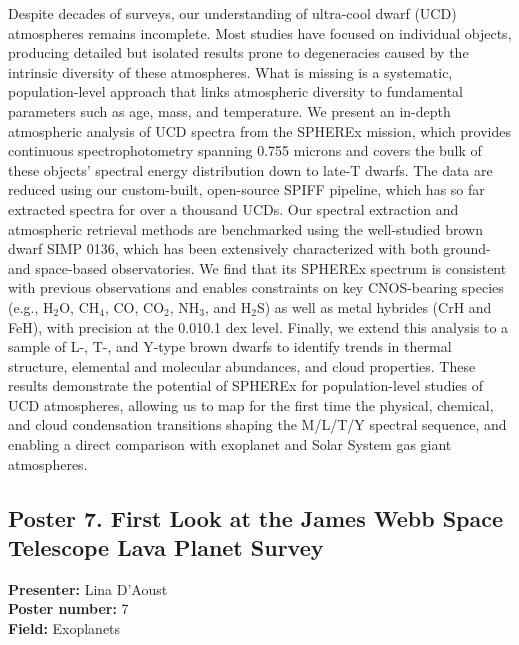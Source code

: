 Despite decades of surveys, our understanding of ultra-cool dwarf (UCD) atmospheres remains incomplete. Most studies have focused on individual objects, producing detailed but isolated results prone to degeneracies caused by the intrinsic diversity of these atmospheres. What is missing is a systematic, population-level approach that links atmospheric diversity to fundamental parameters such as age, mass, and temperature. We present an in-depth atmospheric analysis of UCD spectra from the SPHEREx mission, which provides continuous spectrophotometry spanning 0.755 microns and covers the bulk of these objects' spectral energy distribution down to late-T dwarfs. The data are reduced using our custom-built, open-source SPIFF pipeline, which has so far extracted spectra for over a thousand UCDs. Our spectral extraction and atmospheric retrieval methods are benchmarked using the well-studied brown dwarf SIMP 0136, which has been extensively characterized with both ground- and space-based observatories. We find that its SPHEREx spectrum is consistent with previous observations and enables constraints on key CNOS-bearing species (e.g., H$_2$O, CH$_4$, CO, CO$_2$, NH$_3$, and H$_2$S) as well as metal hybrides (CrH and FeH), with precision at the 0.010.1 dex level. Finally, we extend this analysis to a sample of L-, T-, and Y-type brown dwarfs to identify trends in thermal structure, elemental and molecular abundances, and cloud properties. These results demonstrate the potential of SPHEREx for population-level studies of UCD atmospheres, allowing us to map for the first time the physical, chemical, and cloud condensation transitions shaping the M/L/T/Y spectral sequence, and enabling a direct comparison with exoplanet and Solar System gas giant atmospheres.

\hypertarget{poster-abstract-talk-261}{}\label{poster-abstract-page-talk-261}
\subsection*{Poster 7. First Look at the James Webb Space Telescope Lava Planet Survey}
\textbf{Presenter:} Lina D'Aoust\\
\textbf{Poster number:} 7\\
\textbf{Field:} Exoplanets

